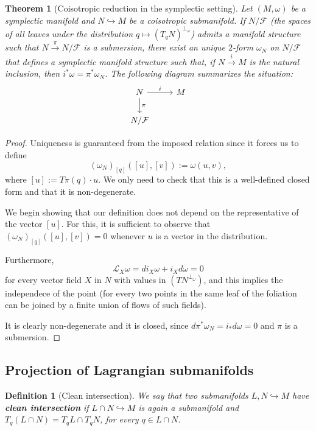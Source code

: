 \documentclass[12pt]{article}
\newtheorem{theorem}{Theorem}[section]
\newtheorem{Def}{Definition}[section]
\begin{document}
\begin{theorem}[Coisotropic reduction in the symplectic
setting] \label{SymplecticReduction} Let $(M , \omega)$ be a symplectic manifold and $N \hookrightarrow M$ be a coisotropic submanifold. If $N / \mathcal{F}$ (the spaces of all leaves under the distribution $q \mapsto (T_qN)^{\perp_\omega}$) admits a manifold structure such that $N \xrightarrow{\pi} N / \mathcal{F}$ is a submersion, there exist an unique $2$-form $\omega_N$ on $N / \mathcal{F}$ that defines a
symplectic manifold structure such that, if $N \xrightarrow{i}M$ is the natural inclusion, then $i^* \omega = \pi ^* \omega_N$. The following diagram summarizes the situation:
 \[
\begin{tikzcd} N \arrow[r, "i"] \arrow[d, "\pi"] & M \\ N / \mathcal{F} \end{tikzcd} \] \end{theorem}
 \begin{proof} Uniqueness is
guaranteed from the imposed relation since it forces us to define $$(\omega_N)_{[q]}([u],[v]):= \omega(u,v),$$ where $[u]:= T\pi(q) \cdot u$. We only need to check that this is a well-defined closed form and that it is non-degenerate.

We begin showing that our definition does not depend on the representative of the vector $[u]$. For this, it is sufficient to
observe that $(\omega_N)_{[q]}([u],[v]) = 0$ whenever $u$ is a vector in the distribution.

Furthermore, $$\mathcal{L}_X \omega = di_X \omega + i_X d\omega = 0$$ for every vector field $X$ in $N$ with values in
$(TN^{\perp_\omega})$, and this implies the independece of the point (for every two points in the same leaf of the foliation can be joined by a finite union of flows of such fields).

It is clearly non-degenerate and it is closed, since $d\pi^* \omega_N = i_*d\omega = 0$ and $\pi$ is a submersion. \end{proof}

\subsection{Projection of Lagrangian submanifolds}

\begin{Def}[Clean intersection]We say that two submanifolds $L, N \hookrightarrow M$ have \textbf{clean intersection} if $L
\cap N \hookrightarrow M$ is again a submanifold and $T_q(L \cap N) = T_q L \cap T_qN$, for every $q \in L \cap N$.\\ \end{Def}
\end{document}
